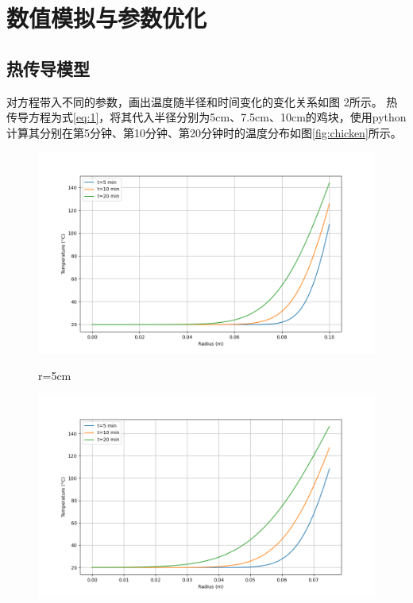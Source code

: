 \documentclass[12pt]{article}
\begin{document}
\section{数值模拟与参数优化}
\subsection{热传导模型}
对方程带入不同的参数，画出温度随半径和时间变化的变化关系如图 2所示。
热传导方程为式\eqref{eq:1}，将其代入半径分别为5cm、7.5cm、10cm的鸡块，使用python计算其分别在第5分钟、第10分钟、第20分钟时的温度分布如图\ref{fig:chicken}所示。
\begin{figure}[htbp]
	\begin{minipage}{0.32\linewidth}
		\vspace{3pt}
		\centerline{\includegraphics[width=\textwidth]{heat_distribution1.png}}
		\centerline{r=5cm}
	\end{minipage}
	\begin{minipage}{0.32\linewidth}
		\vspace{3pt}
		\centerline{\includegraphics[width=\textwidth]{heat_distribution2.png}}

\end{minipage}
\end{figure}
\end{document}
